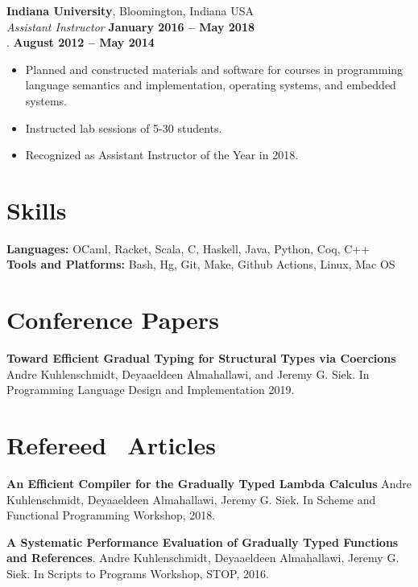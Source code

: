\documentclass[resmargin,line]{res}
\begin{document}
\begin{resume}
{\bf Indiana University}, Bloomington, Indiana USA\\
{\em Assistant Instructor} \hfill {\bf January 2016 -- May 2018}\\
{\color{white} . } \quad \hfill {\bf August 2012 -- May 2014}\\
%
\begin{itemize}
\vspace*{-.35cm}
\item Planned and constructed materials and software for
  courses in programming language semantics and implementation,
  operating systems, and embedded systems.
\item Instructed lab sessions of 5-30 students.
\item Recognized as Assistant Instructor of the Year in 2018.
\end{itemize}
%

\section{\sc Skills}
{\bf Languages:} OCaml, Racket, Scala, C, Haskell, Java, Python, Coq, C++\\
{\bf Tools and Platforms:} Bash, Hg, Git, Make, Github Actions, Linux, Mac OS

\section{\sc Conference Papers}
{\bf Toward Efficient Gradual Typing for Structural Types via Coercions}
Andre Kuhlenschmidt, Deyaaeldeen Almahallawi, and Jeremy G. Siek.
In Programming Language Design and Implementation 2019.

\section{\sc Refereed \, Articles}

{\bf An Efficient Compiler for the Gradually Typed Lambda Calculus}
Andre Kuhlenschmidt, Deyaaeldeen Almahallawi, Jeremy G. Siek.
In Scheme and Functional Programming Workshop, 2018.

{\bf A Systematic Performance Evaluation of Gradually Typed Functions
  and References}.
Andre Kuhlenschmidt, Deyaaeldeen Almahallawi, Jeremy G. Siek.
In Scripts to Programs Workshop, STOP, 2016.


\end{resume}
\end{document}

